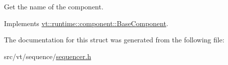 Get the name of the component. 



Implements \hyperlink{structvt_1_1runtime_1_1component_1_1_base_component_a7701485f3539f78d42e6bad47fc7eb78}{vt\+::runtime\+::component\+::\+Base\+Component}.



The documentation for this struct was generated from the following file\+:\begin{DoxyCompactItemize}
\item 
src/vt/sequence/\hyperlink{sequencer_8h}{sequencer.\+h}\end{DoxyCompactItemize}
